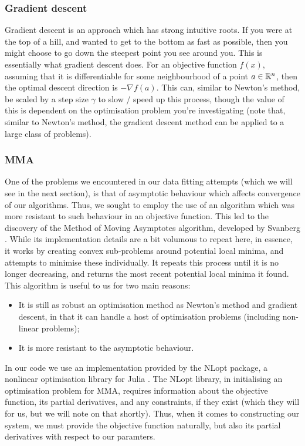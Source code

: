 \subsubsection{Gradient descent}
Gradient descent is an approach which has strong intuitive roots. If you were at the top of a hill, and wanted to get 
to the bottom as fast as possible, then you might choose to go down the steepest point you see around you. This is 
essentially what gradient descent does. For an objective function $f(x)$, assuming that it is differentiable 
for some neighbourhood of a point $a \in \mathbb{R}^n$, then the optimal descent direction is $- \nabla f(a)$. This can, 
similar to Newton's method, be scaled by a step size $\gamma$ to slow / speed up this process, though the value of 
this is dependent on the optimisation problem you're investigating (note that, similar to Newton's method, 
the gradient descent method can be applied to a large class of problems).

\subsubsection{MMA}
One of the problems we encountered in our data fitting attempts (which we will see in the next section), is that 
of asymptotic behaviour which affects convergence of our algorithms. Thus, we sought to employ the use of an algorithm 
which was more resistant to such behaviour in an objective function. This led to the discovery of the Method of Moving 
Asymptotes algorithm, developed 
by Svanberg \cite{mma}. While its implementation details are a bit volumous to repeat here, in essence, it works by creating 
convex sub-problems around potential local minima, and attempts to minimise these individually. It repeats this process until 
it is no longer decreasing, and returns the most recent potential local minima it found. This algorithm is 
useful to us for two main reasons: 
\begin{itemize}
    \item It is still as robust an optimisation method as Newton's method and gradient descent, in that it 
    can handle a host of optimisation problems (including non-linear problems);
    \item It is more resistant to the asymptotic behaviour.
\end{itemize} 

In our code we use an implementation provided by the NLopt package, a nonlinear optimisation library for Julia \cite{nlopt}. The NLopt
library, in initialising an optimisation problem for MMA, requires information about the objective function, its partial derivatives, 
and any constraints, if they exist (which they will for us, but we will note on that shortly). Thus, when it comes to constructing 
our system, we must provide the objective function naturally, but also its partial derivatives with respect to our paramters.


